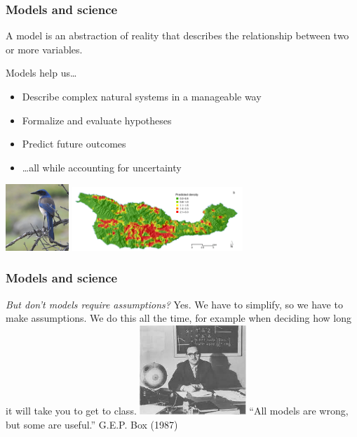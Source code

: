 \documentclass[color=usenames,dvipsnames]{beamer}\usepackage[]{graphicx}\usepackage[]{xcolor}
\begin{document}
\begin{frame}
  \frametitle{Models and science}
  \large
  A model is an abstraction of reality that describes the relationship between two or more variables. \par
  \pause
  \vfill
  {%
    Models help us\dots}
  \begin{itemize}[<+->]
    \item Describe complex natural systems in a manageable way
    \item Formalize and evaluate hypotheses
    \item Predict future outcomes
    \item \dots all while accounting for uncertainty
    \end{itemize}
  \pause
  \vfill
  \centering
  \includegraphics[height=2.5cm]{figs/issj} \hspace{10mm}
  \includegraphics[height=2.4cm]{figs/jay-model} \\
\end{frame}




\begin{frame}
  \frametitle{Models and science}
  \large
  {\it But don't models require assumptions?}
  \pause
  \vfill
  Yes. We have to simplify, so we have to make assumptions.
  \pause
  \vfill
  We do this all the time, for example when deciding how long it will take you to get to class. 
  \pause
  \vfill
  \includegraphics[width=0.3\textwidth]{figs/box}
  ``All models are wrong, but some are useful.'' G.E.P. Box (1987)
\end{frame}
\end{document}
